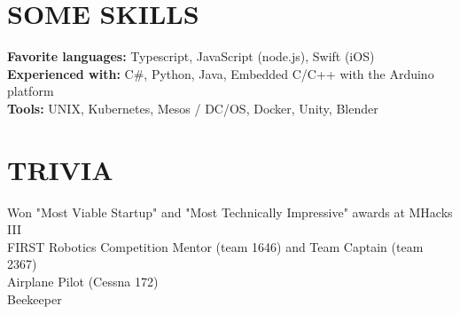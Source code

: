 \documentclass[margin,4pt]{res} %
\begin{document}
\begin{resume}
\section{SOME SKILLS} 
	{\bf Favorite languages:} Typescript, JavaScript (node.js), Swift (iOS)\\
 	{\bf Experienced with:}  C\#, Python, Java, Embedded C/C++ with the Arduino platform \\
	{\bf Tools:} UNIX, Kubernetes, Mesos / DC/OS, Docker, Unity, Blender


\section{TRIVIA}  
	Won "Most Viable Startup" and "Most Technically Impressive" awards at MHacks III\\
	FIRST Robotics Competition Mentor (team 1646) and Team Captain (team 2367)\\
	Airplane Pilot (Cessna 172)\\
	Beekeeper\\


\end{resume}
\end{document}
